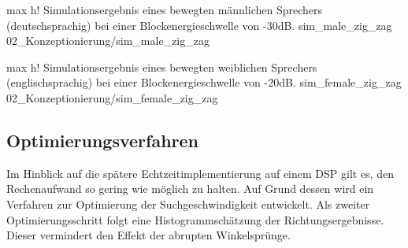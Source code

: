          {max}                                                       %
         {h!}                                                  %
         {Simulationsergebnis eines bewegten männlichen Sprechers (deutschsprachig) bei einer Blockenergieschwelle von -30dB.}    %
         {sim_male_zig_zag}                                               %
         {02_Konzeptionierung/sim_male_zig_zag}    


         {max}                                                       %
         {h!}                                                  %
         {Simulationsergebnis eines bewegten weiblichen Sprechers (englischsprachig) bei einer Blockenergieschwelle von -20dB.}    %
         {sim_female_zig_zag}                                               %
         {02_Konzeptionierung/sim_female_zig_zag}    












                  
\subsection{Optimierungsverfahren}
\label{subsec:Optimierungsverfahren}
Im Hinblick auf die spätere Echtzeitimplementierung auf einem DSP gilt es, den Rechenaufwand so gering wie möglich zu halten. Auf Grund dessen wird ein Verfahren zur Optimierung der Suchgeschwindigkeit entwickelt. Als zweiter Optimierungsschritt folgt eine Histogrammschätzung der Richtungsergebnisse. Dieser vermindert den Effekt der abrupten Winkelsprünge. 

